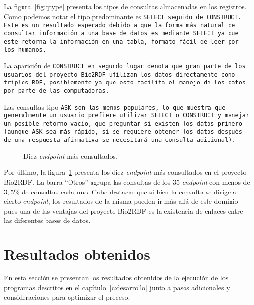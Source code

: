 La figura~\ref{fig:qtype} presenta los tipos de consultas almacenadas en los
registros. Como podemos notar el tipo predominante es \tt{SELECT} seguido de
\tt{CONSTRUCT}. Este es un resultado esperado debido a que la forma más natural
de consultar información a una base de datos es mediante \tt{SELECT} ya que este
retorna la información en una tabla, formato fácil de leer por los humanos.

La aparición de \tt{CONSTRUCT} en segundo lugar denota que gran parte de los
usuarios del proyecto Bio2RDF utilizan los datos directamente como  triples RDF,
posiblemente ya que esto facilita el manejo de los datos por parte de las
computadoras.

Las consultas tipo \tt{ASK} son las menos populares, lo que muestra que
generalmente un usuario prefiere utilizar \tt{SELECT} o \tt{CONSTRUCT} y manejar
un posible retorno vacío, que preguntar si existen los datos primero (aunque
\tt{ASK} sea más rápido, si se requiere obtener los datos después de una
respuesta afirmativa se necesitará una consulta adicional).

\begin{figure}[ht]
  \caption{Diez \emph{endpoint} más consultados.}\label{fig:t10endp}
\end{figure}

Por último, la figura~\ref{fig:t10endp} presenta los diez \emph{endpoint} más
consultados en el proyecto Bio2RDF. La barra ``Otros'' agrupa las consultas de
los 35 \emph{endpoint} con menos de $3,5\%$ de consultas cada uno. Cabe destacar
que si bien la consulta se dirige a cierto \emph{endpoint}, los resultados de la
misma pueden ir más allá de este dominio pues una de las ventajas del proyecto
Bio2RDF es la existencia de enlaces entre las diferentes bases de datos.

\section{Resultados obtenidos}\label{sec:res}
En esta sección se presentan los resultados obtenidos de la ejecución de los
programas descritos en el capítulo~\ref{c:desarrollo} junto a pasos 
adicionales y consideraciones para optimizar el proceso.

